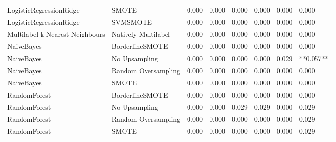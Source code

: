 \begin{tabular}{llllllll}
        LogisticRegressionRidge &                         SMOTE &     0.000 &                     0.000 &                 0.000 &                  0.000 &                                   0.000 &     0.000 \\
        LogisticRegressionRidge &                      SVMSMOTE &     0.000 &                     0.000 &                 0.000 &                  0.000 &                                   0.000 &     0.000 \\
Multilabel k Nearest Neighbours &           Natively Multilabel &     0.000 &                     0.000 &                 0.000 &                  0.000 &                                   0.000 &     0.000 \\
                     NaiveBayes &               BorderlineSMOTE &     0.000 &                     0.000 &                 0.000 &                  0.000 &                                   0.000 &     0.000 \\
                     NaiveBayes &                 No Upsampling &     0.000 &                     0.000 &                 0.000 &                  0.000 &                                   0.029 & **0.057** \\
                     NaiveBayes &           Random Oversampling &     0.000 &                     0.000 &                 0.000 &                  0.000 &                                   0.000 &     0.000 \\
                     NaiveBayes &                         SMOTE &     0.000 &                     0.000 &                 0.000 &                  0.000 &                                   0.000 &     0.000 \\
                   RandomForest &               BorderlineSMOTE &     0.000 &                     0.000 &                 0.000 &                  0.000 &                                   0.000 &     0.000 \\
                   RandomForest &                 No Upsampling &     0.000 &                     0.000 &                 0.029 &                  0.029 &                                   0.000 &     0.029 \\
                   RandomForest &           Random Oversampling &     0.000 &                     0.000 &                 0.000 &                  0.000 &                                   0.000 &     0.029 \\
                   RandomForest &                         SMOTE &     0.000 &                     0.000 &                 0.000 &                  0.000 &                                   0.000 &     0.029 \\

\end{tabular}
